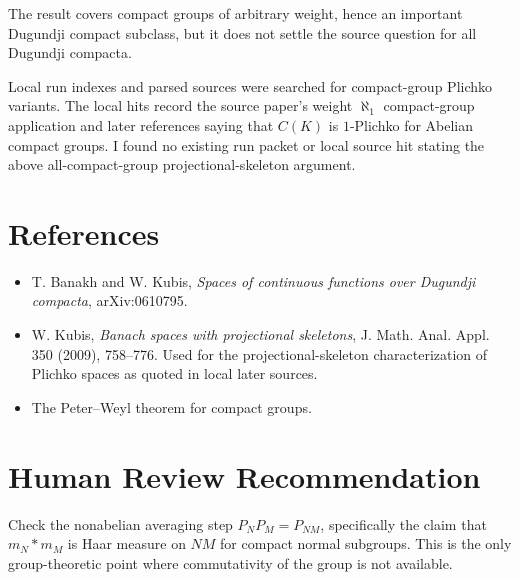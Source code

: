 \documentclass[11pt]{article}
\newcommand{\C}{C}
\begin{document}
The result covers compact groups of arbitrary weight, hence an important
Dugundji compact subclass, but it does not settle the source question for all
Dugundji compacta.

Local run indexes and parsed sources were searched for compact-group
Plichko variants.  The local hits record the source paper's weight
\(\aleph_1\) compact-group application and later references saying that
\(\C(K)\) is \(1\)-Plichko for Abelian compact groups.  I found no existing
run packet or local source hit stating the above all-compact-group
projectional-skeleton argument.

\section*{References}

\begin{itemize}
\item T. Banakh and W. Kubis, \emph{Spaces of continuous functions over
Dugundji compacta}, arXiv:0610795.
\item W. Kubis, \emph{Banach spaces with projectional skeletons}, J. Math.
Anal. Appl. 350 (2009), 758--776.  Used for the projectional-skeleton
characterization of Plichko spaces as quoted in local later sources.
\item The Peter--Weyl theorem for compact groups.
\end{itemize}

\section*{Human Review Recommendation}

Check the nonabelian averaging step \(P_NP_M=P_{NM}\), specifically the
claim that \(m_N*m_M\) is Haar measure on \(NM\) for compact normal
subgroups.  This is the only group-theoretic point where commutativity of the
group is not available.
\end{document}
